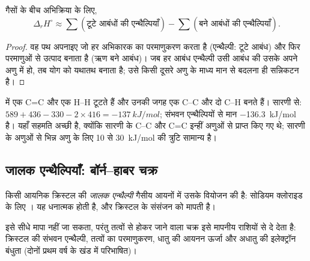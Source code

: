 \begin{proposition}[आबंध एन्थैल्पियों से आकलन]\label{prop:b2:reaction-enthalpy:bond-estimate}
गैसों के बीच अभिक्रिया के लिए,
\[
  \Delta_r H^\circ \approx \sum(\text{टूटे आबंधों की एन्थैल्पियाँ}) -
  \sum(\text{बने आबंधों की एन्थैल्पियाँ}).
\]
\end{proposition}

\begin{proof}
वह पथ अपनाइए जो हर अभिकारक का परमाणुकरण करता है (एन्थैल्पी: टूटे
आबंध) और फिर परमाणुओं से उत्पाद बनाता है (ऋण बने आबंध)। जब हर आबंध
एन्थैल्पी उसी आबंध की उसके अपने अणु में हो, तब  योग को यथातथ बनाता है; उसे किसी दूसरे अणु के माध्य मान से बदलना ही
सन्निकटन है।
\end{proof}

\begin{example}[एथीन का हाइड्रोजनन]\label{ex:b2:reaction-enthalpy:hydrogenation}
 में एक C=C और एक H--H टूटते हैं और
उनकी जगह एक C--C और दो C--H बनते हैं। सारणी से: $589 + 436 - 330 - 2
\times 416 = \qty{-137}{kJ/mol}$; संभवन एन्थैल्पियों से मान
\qty{-136.3}{kJ/mol} है। यहाँ सहमति अच्छी है, क्योंकि सारणी के C--C
और C=C इन्हीं अणुओं से प्राप्त किए गए थे; सारणी के अणुओं से भिन्न
अणु के लिए 10 से \qty{30}{kJ/mol} की त्रुटि सामान्य है।
\end{example}

\subsection*{जालक एन्थैल्पियाँ: बॉर्न--हाबर चक्र}

\begin{definition}[जालक एन्थैल्पी]\label{def:b2:reaction-enthalpy:lattice-enthalpy}
किसी आयनिक क्रिस्टल की \emph{जालक एन्थैल्पी}
गैसीय आयनों में उसके वियोजन की  है:
सोडियम क्लोराइड के लिए । यह धनात्मक होती है,
और क्रिस्टल के संसंजन को मापती है।
\end{definition}

इसे सीधे मापा नहीं जा सकता, परंतु तत्वों से होकर जाने वाला चक्र इसे
मापनीय राशियों से दे देता है: क्रिस्टल की संभवन एन्थैल्पी, तत्वों का
परमाणुकरण, धातु की आयनन ऊर्जा और अधातु की इलेक्ट्रॉन बंधुता
(दोनों प्रथम वर्ष के खंड में परिभाषित)।

